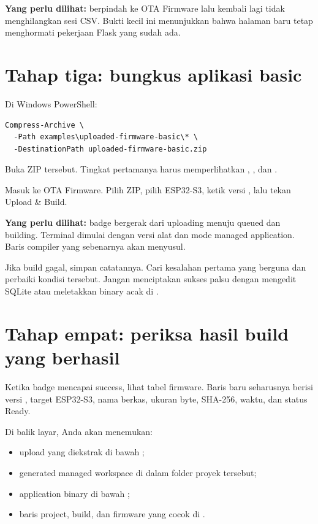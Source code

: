 \textbf{Yang perlu dilihat:} berpindah ke OTA Firmware lalu kembali lagi tidak menghilangkan sesi CSV. Bukti kecil ini menunjukkan bahwa halaman baru tetap menghormati pekerjaan Flask yang sudah ada.

\section{Tahap tiga: bungkus aplikasi basic}

Di Windows PowerShell:

\begin{lstlisting}
Compress-Archive \
  -Path examples\uploaded-firmware-basic\* \
  -DestinationPath uploaded-firmware-basic.zip
\end{lstlisting}

Buka ZIP tersebut. Tingkat pertamanya harus memperlihatkan , , dan .

Masuk ke OTA Firmware. Pilih ZIP, pilih ESP32-S3, ketik versi \codepath{1.0.1}, lalu tekan Upload \& Build.

\textbf{Yang perlu dilihat:} badge bergerak dari uploading menuju queued dan building. Terminal dimulai dengan versi alat dan mode managed application. Baris compiler yang sebenarnya akan menyusul.

Jika build gagal, simpan catatannya. Cari kesalahan pertama yang berguna dan perbaiki kondisi tersebut. Jangan menciptakan sukses palsu dengan mengedit SQLite atau meletakkan binary acak di .

\section{Tahap empat: periksa hasil build yang berhasil}

Ketika badge mencapai success, lihat tabel firmware. Baris baru seharusnya berisi versi , target ESP32-S3, nama berkas, ukuran byte, SHA-256, waktu, dan status Ready.

Di balik layar, Anda akan menemukan:

\begin{itemize}
  \item upload yang diekstrak di bawah ;
  \item generated managed workspace di dalam folder proyek tersebut;
  \item application binary di bawah \codepath{firmware-builds};
  \item baris project, build, dan firmware yang cocok di .
\end{itemize}

